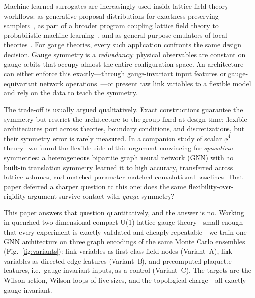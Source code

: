 \documentclass[aps,prd,twocolumn,superscriptaddress,nofootinbib]{revtex4-2}
\begin{document}
Machine-learned surrogates are increasingly used inside lattice field
theory workflows: as generative proposal distributions for exactness-preserving
samplers~\cite{Albergo2019,Kanwar2020,Boyda2021}, as part of a broader
program coupling lattice field theory to probabilistic machine
learning~\cite{Bachtis2021}, and as general-purpose emulators of local
theories~\cite{Favoni2022,Luo2021,Rayat2026,Brehm2026}. For gauge
theories, every such application confronts the same design decision.
Gauge symmetry is a \emph{redundancy}: physical observables are constant
on gauge orbits that occupy almost the entire configuration space. An
architecture can either enforce this exactly---through gauge-invariant
input features or gauge-equivariant network
operations~\cite{Kanwar2020,Boyda2021,Favoni2022,Luo2021,Rayat2026}---or
present raw link variables to a flexible model and rely on the data to
teach the symmetry.

The trade-off is usually argued qualitatively. Exact constructions
guarantee the symmetry but restrict the architecture to the group fixed
at design time; flexible architectures port across theories, boundary
conditions, and discretizations, but their symmetry error is rarely
measured. In a companion study of scalar $\phi^4$
theory~\cite{Brehm2026} we found the flexible side of this argument
convincing for \emph{spacetime} symmetries: a heterogeneous bipartite
graph neural network (GNN) with no built-in translation symmetry learned
it to high accuracy, transferred across lattice volumes, and matched
parameter-matched convolutional baselines. That paper deferred a sharper
question to this one: does the same flexibility-over-rigidity argument
survive contact with \emph{gauge} symmetry?

This paper answers that question quantitatively, and the answer is no.
Working in quenched two-dimensional compact U(1) lattice gauge
theory---small enough that every experiment is exactly validated and
cheaply repeatable---we train one GNN architecture on three graph
encodings of the same Monte Carlo ensembles
(Fig.~\ref{fig:variants}): link variables as first-class field nodes
(Variant~A), link variables as directed edge features (Variant~B), and
precomputed plaquette features, i.e.\ gauge-invariant inputs, as a
control (Variant~C). The targets are the Wilson action, Wilson loops of
five sizes, and the topological charge---all exactly gauge invariant.
\end{document}
